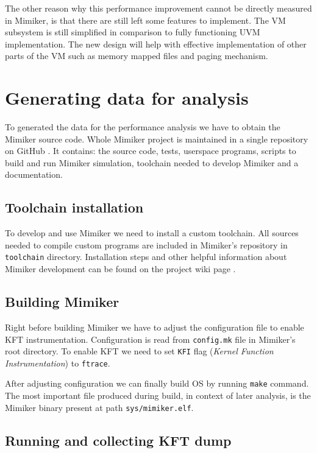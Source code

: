 The other reason why this performance improvement cannot be directly measured in Mimiker, is that there are still left some features to implement.
The VM subsystem is still simplified in comparison to fully functioning UVM implementation.
The new design will help with effective implementation of other parts of the VM such as memory mapped files and paging mechanism.

\section{Generating data for analysis}

To generated the data for the performance analysis we have to obtain the Mimiker source code.
Whole Mimiker project is maintained in a single repository on GitHub \cite{mimiker:sources}.
It contains: the source code, tests, userspace programs, scripts to build and run Mimiker simulation, toolchain needed to develop Mimiker
and a documentation.

\subsection{Toolchain installation}

To develop and use Mimiker we need to install a custom toolchain.
All sources needed to compile custom programs are included in Mimiker's repository in {\tt toolchain} directory.
Installation steps and other helpful information about Mimiker development can be found on the project wiki page \cite{mimiker:wiki}.

\subsection{Building Mimiker}

Right before building Mimiker we have to adjust the configuration file to enable KFT instrumentation.
Configuration is read from {\tt config.mk} file in Mimiker's root directory.
To enable KFT we need to set {\tt KFI} flag ({\it Kernel Function Instrumentation}) to {\tt ftrace}.

After adjusting configuration we can finally build OS by running {\tt make} command.
The most important file produced during build, in context of later analysis, is the Mimiker binary present at path {\tt sys/mimiker.elf}.

\subsection{Running and collecting KFT dump}

